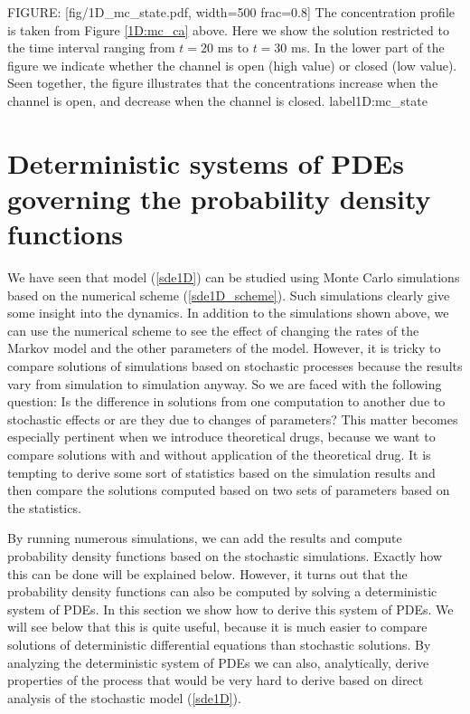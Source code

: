 FIGURE: [fig/1D_mc_state.pdf, width=500 frac=0.8]  The concentration profile is taken from Figure \ref{1D:mc_ca} above. Here we show the solution restricted to the time interval ranging from $t=20$ ms to $t=30$ ms. In the lower part of the figure we indicate whether the channel is open (high value) or closed (low value). Seen together, the figure illustrates that the concentrations increase when the channel is open, and decrease when the channel is closed.   label{1D:mc_state}

\section[Probability density functions]{Deterministic systems of PDEs governing the probability density functions}
\label{sec:pdf}

We have seen that model (\ref{sde1D}) can be studied using Monte Carlo simulations based on the numerical scheme (\ref{sde1D_scheme}). Such simulations clearly give some insight into the dynamics. In addition to the simulations shown above, we can use the numerical scheme to see the effect of changing the rates of the Markov model and the other parameters of the model. However, it is tricky to compare solutions of simulations based on stochastic processes because the results vary from simulation to simulation anyway. So we are faced with the following question: Is the difference in solutions from one computation to another due to stochastic effects or are they due to changes of parameters? This matter becomes especially pertinent when we introduce theoretical drugs, because we want to compare solutions with and without application of the theoretical drug. It is tempting to derive some sort of statistics based on the simulation results and then compare the solutions computed based on two sets of parameters based on the statistics.

 By running numerous simulations, we can add the results and compute probability density functions based on the stochastic simulations. Exactly how this can be done will be explained below. However, it turns out that the probability density functions can also be computed by solving a deterministic system of PDEs. In this section we show how to derive this system of PDEs. We will see below that this is quite useful, because it is much easier to compare solutions of deterministic differential equations than  stochastic solutions. By analyzing the deterministic system of PDEs we can also, analytically, derive properties of the process that would be very hard to derive based on direct analysis of the stochastic model (\ref{sde1D}).

